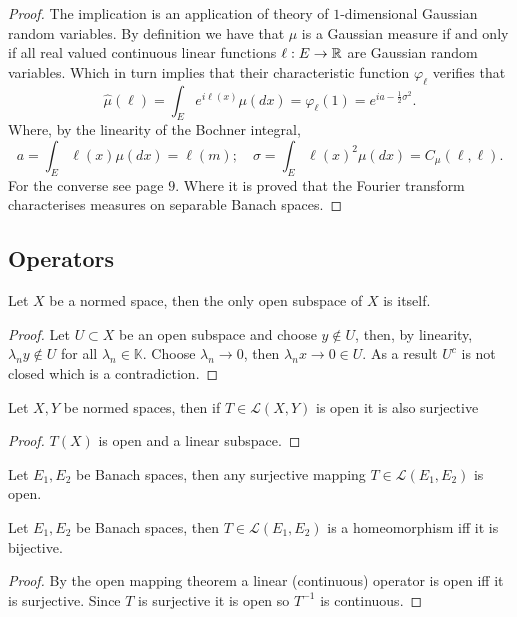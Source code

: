 \documentclass[
    a4paper,
    DIV=14,
    abstract=true,
    numbers=noenddot
]{scrartcl}
\begin{document}
\begin{proof}
	The implication is an application of theory of $1$-dimensional Gaussian random variables. By definition we have that $\mu $  is a Gaussian measure if and only if all real valued continuous linear functions $\ell:E\to \mathbb{R}$ are Gaussian random variables. Which in turn implies that their characteristic function $\varphi_\ell $ verifies that
	\begin{equation*}
		\hat{\mu }(\ell )=\int_{E} e^{i\ell (x)} \mu (dx)=\varphi_{\ell}(1)=e^{ia -\frac{1}{2}\sigma^2} .
	\end{equation*}
	Where, by the linearity of the Bochner integral,
	\begin{equation*}
		a       =\int_{E}\ell(x)\mu(dx)=\ell(m);\quad
		\sigma  =\int_{E}\ell(x)^2\mu(dx)=C_\mu (\ell ,\ell).
	\end{equation*}
	For the converse see \cite{hairer2009introduction} page $9$. Where it is proved that the Fourier transform characterises measures on separable Banach spaces.
\end{proof}




\subsection{Operators}
\begin{proposition}
	Let $X$ be a normed space, then the only open subspace of $X$ is itself.
\end{proposition}
\begin{proof}
	Let $U\subset X$ be an open subspace and choose $y\notin U$, then, by linearity, $\lambda_n y\notin U$ for all $\lambda_n\in\mathbb{K}$. Choose $\lambda_n\to 0$, then $\lambda_n x\to 0 \in U$. As a result $U^c$ is not closed which is a contradiction.
\end{proof}
\begin{proposition}
	Let $X, Y$ be normed spaces, then if $T\in\mathcal{L}(X,Y)$ is open it is also surjective
\end{proposition}
\begin{proof}
	$T(X)$ is open and a linear subspace.
\end{proof}
\begin{proposition}
	Let $E_1,E_2$ be Banach spaces, then any surjective mapping $T\in\mathcal{L}(E_1,E_2)$ is open.
\end{proposition}
\begin{proposition}
	Let $E_1,E_2$ be Banach spaces, then $T\in\mathcal{L}(E_1,E_2)$ is a homeomorphism iff it is bijective.
\end{proposition}
\begin{proof}
	By the open mapping theorem a linear (continuous) operator is open iff it is surjective. Since $T$ is surjective it is open so $T^{-1}$ is continuous.
\end{proof}
\end{document}
